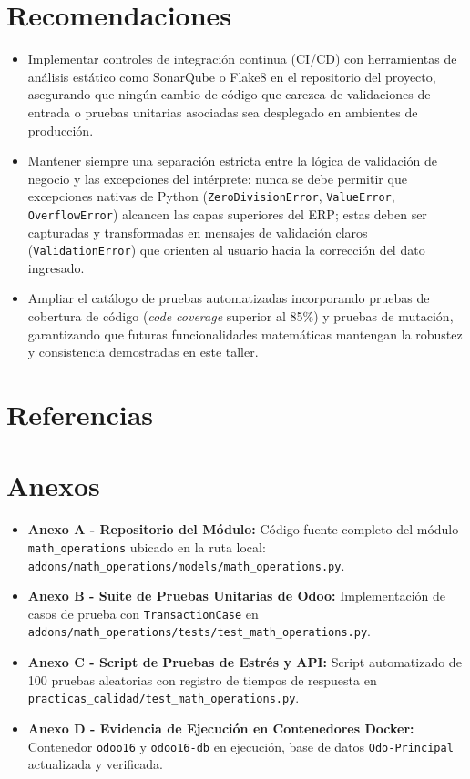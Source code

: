 \documentclass{article}
\begin{document}
\section{Recomendaciones}
\begin{itemize}
    \item Implementar controles de integración continua (CI/CD) con herramientas de análisis estático como SonarQube o Flake8 en el repositorio del proyecto, asegurando que ningún cambio de código que carezca de validaciones de entrada o pruebas unitarias asociadas sea desplegado en ambientes de producción.
    \item Mantener siempre una separación estricta entre la lógica de validación de negocio y las excepciones del intérprete: nunca se debe permitir que excepciones nativas de Python (\texttt{ZeroDivisionError}, \texttt{ValueError}, \texttt{OverflowError}) alcancen las capas superiores del ERP; estas deben ser capturadas y transformadas en mensajes de validación claros (\texttt{ValidationError}) que orienten al usuario hacia la corrección del dato ingresado.
    \item Ampliar el catálogo de pruebas automatizadas incorporando pruebas de cobertura de código (\textit{code coverage} superior al 85\%) y pruebas de mutación, garantizando que futuras funcionalidades matemáticas mantengan la robustez y consistencia demostradas en este taller.
\end{itemize}

\section{Referencias}
\vspace{-2em}
\renewcommand{\refname}{}

\nocite{*}


\section{Anexos}
\begin{itemize}
    \item \textbf{Anexo A - Repositorio del Módulo:} Código fuente completo del módulo \texttt{math\_operations} ubicado en la ruta local: \texttt{addons/math\_operations/models/math\_operations.py}.
    \item \textbf{Anexo B - Suite de Pruebas Unitarias de Odoo:} Implementación de casos de prueba con \texttt{TransactionCase} en \texttt{addons/math\_operations/tests/test\_math\_operations.py}.
    \item \textbf{Anexo C - Script de Pruebas de Estrés y API:} Script automatizado de 100 pruebas aleatorias con registro de tiempos de respuesta en \texttt{practicas\_calidad/test\_math\_operations.py}.
    \item \textbf{Anexo D - Evidencia de Ejecución en Contenedores Docker:} Contenedor \texttt{odoo16} y \texttt{odoo16-db} en ejecución, base de datos \texttt{Odo-Principal} actualizada y verificada.
\end{itemize}
\end{document}
